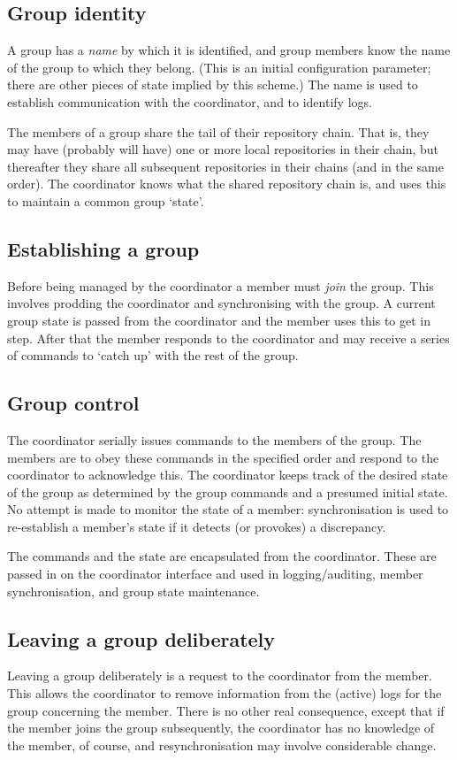 \documentclass[a4paper,12pt]{article}
\begin{document}
\subsection{Group identity}
A group has a \emph{name} by which it is identified, and group members know the name of the group to which they belong. (This is an initial configuration parameter; there are other pieces of state implied by this scheme.) The name is used to establish communication with the coordinator, and to identify logs.

The members of a group share the tail of their repository chain. That is, they may have (probably will have) one or more local repositories in their chain, but thereafter they share all subsequent repositories in their chains (and in the same order). The coordinator knows what the shared repository chain is, and uses this to maintain a common group `state'.

\subsection{Establishing a group}
Before being managed by the coordinator a member must \emph{join} the group. This involves prodding the coordinator and synchronising with the group. A current group state is passed from the coordinator and the member uses this to get in step. After that the member responds to the coordinator and may receive a series of commands to `catch up' with the rest of the group.

\subsection{Group control}
The coordinator serially issues commands to the members of the group. The members are to obey these commands in the specified order and respond to the coordinator to acknowledge this. The coordinator keeps track of the desired state of the group as determined by the group commands and a presumed initial state. No attempt is made to monitor the state of a member: synchronisation is used to re-establish a member's state if it detects (or provokes) a discrepancy.

The commands and the state are encapsulated from the coordinator. These are passed in on the coordinator interface and used in logging/auditing, member synchronisation, and group state maintenance.

\subsection{Leaving a group deliberately}
Leaving a group deliberately is a request to the coordinator from the member. This allows the coordinator to remove information from the (active) logs for the group concerning the member. There is no other real consequence, except that if the member joins the group subsequently, the coordinator has no knowledge of the member, of course, and resynchronisation may involve considerable change.
\end{document}
